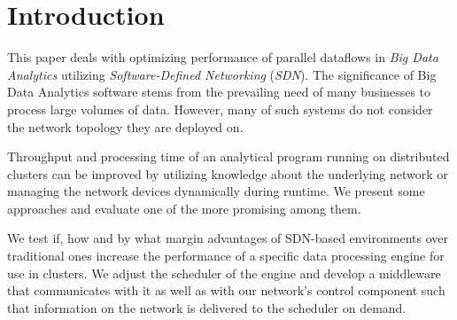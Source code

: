 \section{Introduction}
This paper deals with optimizing performance of parallel dataflows in \textit{Big Data Analytics}
utilizing \textit{Software-Defined Networking} (\textit{SDN}). The significance of Big Data
Analytics software stems from the prevailing need of many businesses to process large volumes of
data. However, many of such systems do not consider the network topology they are deployed on.

Throughput and processing time of an analytical program running on distributed clusters can be
improved by utilizing knowledge about the underlying network or managing the network devices
dynamically during runtime. We present some approaches and evaluate one of the more promising among
them.

We test if, how and by what margin advantages of SDN-based environments over traditional ones
increase the performance of a specific data processing engine for use in clusters. We adjust the
scheduler of the engine and develop a middleware that communicates with it as well as with our
network's control component such that information on the network is delivered to the scheduler on
demand.
